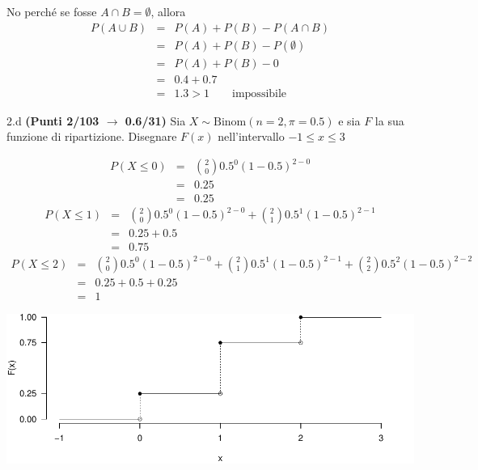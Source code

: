 \documentclass[
  11pt,
]{book}
\theoremstyle{mytheoremstyle}
\theoremstyle{mydefstyle}
\newenvironment{sol}
  {
  \begin{tcolorbox}[enhanced,breakable,arc=0.1mm,boxrule=1pt,colback=white,colframe=iblue,
  title=\bf \fontfamily{lmss}\selectfont \hspace{.5 cm} Soluzione,drop fuzzy shadow]

}{
\end{tcolorbox}
  }
\begin{document}
\begin{sol}
No perché se fosse \(A\cap B=\emptyset\), allora
\begin{eqnarray*}
P(A \cup B)    &=&  P(A) + P(B) - P(A\cap B)\\
               &=&  P(A) + P(B) - P(\emptyset)\\
               &=&  P(A) + P(B) - 0 \\
               &=&  0.4 + 0.7\\
               &=& 1.3 > 1 \qquad\text{impossibile}
\end{eqnarray*}

\end{sol}

2.d \textbf{(Punti 2/103 \(\rightarrow\) 0.6/31)} Sia \(X\sim\text{Binom}(n=2,\pi=0.5)\) e sia \(F\) la sua funzione di ripartizione. Disegnare \(F(x)\) nell'intervallo \(-1\leq x\leq 3\)

\begin{sol}

\normalsize 
\begin{eqnarray*}
      P( X \leq 0 ) &=& \binom{ 2 }{ 0 } 0.5 ^{ 0 }(1- 0.5 )^{ 2 - 0 } \\                 &=& 0.25 \\                 &=& 0.25 
   \end{eqnarray*}
\normalsize  \normalsize 
\begin{eqnarray*}
      P( X \leq 1 ) &=& \binom{ 2 }{ 0 } 0.5 ^{ 0 }(1- 0.5 )^{ 2 - 0 }+\binom{ 2 }{ 1 } 0.5 ^{ 1 }(1- 0.5 )^{ 2 - 1 } \\                 &=& 0.25+0.5 \\                 &=& 0.75 
   \end{eqnarray*}
\normalsize  \normalsize 
\begin{eqnarray*}
      P( X \leq 2 ) &=& \binom{ 2 }{ 0 } 0.5 ^{ 0 }(1- 0.5 )^{ 2 - 0 }+\binom{ 2 }{ 1 } 0.5 ^{ 1 }(1- 0.5 )^{ 2 - 1 }+\binom{ 2 }{ 2 } 0.5 ^{ 2 }(1- 0.5 )^{ 2 - 2 } \\                 &=& 0.25+0.5+0.25 \\                 &=& 1 
   \end{eqnarray*}
\normalsize 

\begin{center}\includegraphics{Esami_passati_con_soluzioni_files/figure-latex/2024-97-1} \end{center}

\end{sol}
\end{document}
